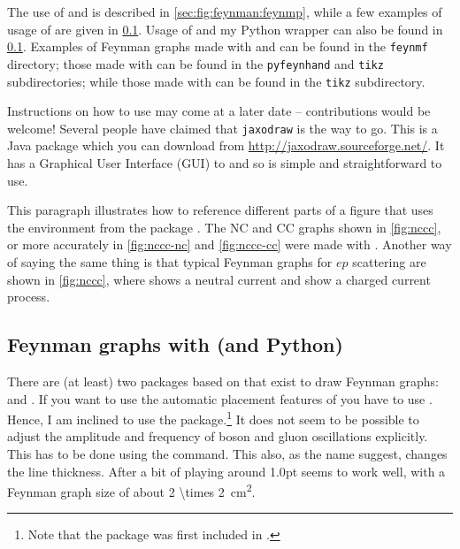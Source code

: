 The use of  and  is
described in \cref{sec:fig:feynman:feynmp}, while a few
examples of usage of \Package{\TikZ} are given in
\cref{sec:fig:feynman:tikz}.
Usage of  and my Python wrapper 
can also be found in \cref{sec:fig:feynman:tikz}.
Examples of Feynman graphs made
with  and  can be found in the \texttt{feynmf} directory;
those made with  can be found in the \texttt{pyfeynhand} and \texttt{tikz} subdirectories;
while those made with \Package{\TikZ} can be found in the \texttt{tikz} subdirectory.

Instructions on how to use  may come at a later
date -- contributions would be welcome! Several people have claimed
that \texttt{jaxodraw} is the way to go. This is a Java package which
you can download from \url{http://jaxodraw.sourceforge.net/}. It has
a Graphical User Interface (GUI) to  and so is simple and
straightforward to use.

\begin{tcblisting}{}
This paragraph illustrates how to reference different parts of a
figure that uses the environment  from
the package .
The NC and CC graphs shown in \cref{fig:nccc}, or more accurately
in \cref{fig:nccc-nc} and \cref{fig:nccc-cc} were made with .
Another way of saying the same thing is that typical Feynman graphs
for \(ep\) scattering are shown in \cref{fig:nccc},
where  shows a neutral current and 
show a charged current process.
\end{tcblisting}


\subsection{Feynman graphs with \TikZ (and Python)}%
\label{sec:fig:feynman:tikz}

There are (at least) two packages based on \TikZ that exist to draw Feynman graphs:
 and .
If you want to use the automatic placement features of 
you have to use \LuaLaTeX.
Hence, I am inclined to use the  package.\footnote{%
Note that the  package was first included in .}
It does not seem to be possible to adjust the amplitude and frequency
of boson and gluon oscillations explicitly.
This has to be done using the  command.
This also, as the name suggest, changes the line thickness.
After a bit of playing around \num{1.0}{pt} seems to work well,
with a Feynman graph size of about \qty[parse-numbers=false]{2 \times 2}{\cm^{2}}.

